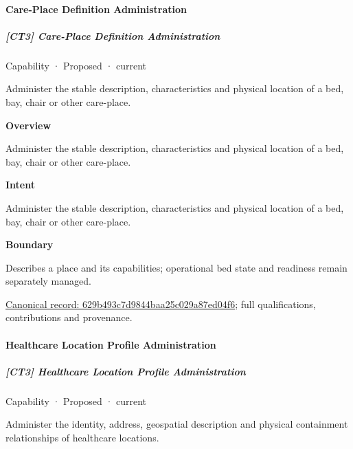 \paragraph{Care-Place Definition Administration}

\subparagraph{[CT3] Care-Place Definition Administration}

\label{element:629b493c7d9844baa25c029a87ed04f6}
{\small Capability · Proposed · current}\par

Administer the stable description, characteristics and physical location of a bed, bay, chair or other care-place.



\textbf{Overview}



Administer the stable description, characteristics and physical location of a bed, bay, chair or other care-place.



\textbf{Intent}



Administer the stable description, characteristics and physical location of a bed, bay, chair or other care-place.



\textbf{Boundary}



Describes a place and its capabilities; operational bed state and readiness remain separately managed.


{\footnotesize \href{../../../../continuum/strategy/capability/629b493c7d9844baa25c029a87ed04f6.md}{Canonical record: 629b493c7d9844baa25c029a87ed04f6}; full qualifications, contributions and provenance.}\par
\paragraph{Healthcare Location Profile Administration}

\subparagraph{[CT3] Healthcare Location Profile Administration}

\label{element:e579e54a08bb4f899a504aa998ba246b}
{\small Capability · Proposed · current}\par

Administer the identity, address, geospatial description and physical containment relationships of healthcare locations.



